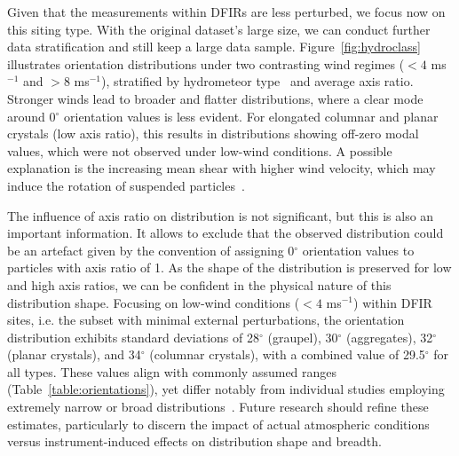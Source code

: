 \documentclass[draft]{agujournal2019}
\begin{document}
Given that the measurements within DFIRs are less perturbed, we focus now on this siting type. With the original dataset's large size, we can conduct further data stratification and still keep a large data sample. Figure~\ref{fig:hydroclass} illustrates orientation distributions under two contrasting wind regimes ($<4$ ms$^{-1}$ and $>8$ ms$^{-1}$), stratified by hydrometeor type~\cite{Praz_AMT_2017} and average axis ratio. Stronger winds lead to broader and flatter distributions, where a clear mode around 0$^\circ$ orientation values is less evident. For elongated columnar and planar crystals (low axis ratio), this results in distributions showing off-zero modal values, which were not observed under low-wind conditions. A possible explanation is the increasing mean shear with higher wind velocity, which may induce the rotation of suspended particles~\cite{Saffman_JFM_1956}.

The influence of axis ratio on distribution is not significant, but this is also an important information. It allows to exclude that the observed distribution could be an artefact given by the convention of assigning 0$^\circ$ orientation values to particles with axis ratio of 1. As the shape of the distribution is preserved for low and high axis ratios, we can be confident in the physical nature of this distribution shape. 
 Focusing on low-wind conditions ($<4$ ms$^{-1}$) within DFIR sites, i.e. the subset with minimal external perturbations, the orientation distribution exhibits standard deviations of 28$^\circ$ (graupel), 30$^\circ$ (aggregates), 32$^\circ$ (planar crystals), and 34$^\circ$ (columnar crystals), with a combined value of 29.5$^\circ$ for all types. These values align with commonly assumed ranges (Table~\ref{table:orientations}), yet differ notably from individual studies employing extremely narrow or broad distributions~\cite{Matrosov_JAM_2001, Matrosov_JAS_2005, Ryzhkov_JAMC_2011, Bukovic_JAMC_2018}. Future research should refine these estimates, particularly to discern the impact of actual atmospheric conditions versus instrument-induced effects on distribution shape and breadth.
\end{document}
